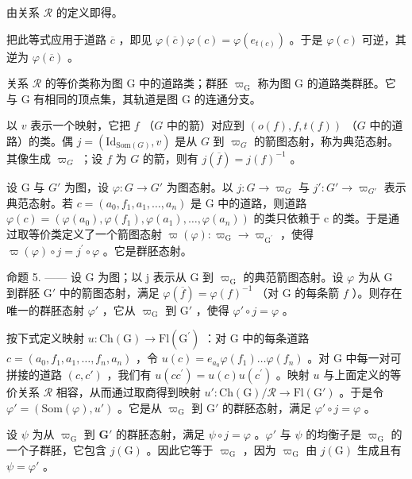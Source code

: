 由关系 \(\mathcal{R}\) 的定义即得。

把此等式应用于道路 \(\overline{c}\) ，即见 \(\varphi(\overline{c})\varphi(c)=\varphi(e_{t(c)})\) 。于是 \(\varphi(c)\) 可逆，其逆为 \(\varphi(\overline{c})\) 。

关系 \(\mathcal{R}\) 的等价类称为图 G 中的道路类；群胚 \(\varpi_{\mathrm{G}}\) 称为图 G 的道路类群胚。它与 G 有相同的顶点集，其轨道是图 G 的连通分支。

以 \(v\) 表示一个映射，它把 \(f\) （\(G\) 中的箭）对应到 \((o(f), f, t(f))\) （\(G\) 中的道路）的类。偶 \(j = (\mathrm{Id}_{\mathrm{Som}(G)}, v)\) 是从 \(G\) 到 \(\varpi_G\) 的箭图态射，称为典范态射。其像生成 \(\varpi_G\) ；设 \(f\) 为 \(G\) 的箭，则有 \(j(\overline{f}) = j(f)^{-1}\) 。

设 G 与 \(G'\) 为图，设 \(\varphi\colon G \to G'\) 为图态射。以 \(j\colon G \to \varpi_{G}\) 与 \(j'\colon G' \to \varpi_{G'}\) 表示典范态射。若 \(c = (a_0, f_1, a_1, \ldots, a_n)\) 是 G 中的道路，则道路 \(\varphi(c) = (\varphi(a_0), \varphi(f_1), \varphi(a_1), \ldots, \varphi(a_n))\) 的类只依赖于 c 的类。于是通过取等价类定义了一个箭图态射 \(\varpi(\varphi)\colon\varpi_{\mathrm{G}}\to\varpi_{\mathrm{G}^{\prime}}\) ，使得 \(\varpi(\varphi)\circ j=j^{\prime}\circ\varphi\) 。它是群胚态射。

命题 5. —— 设 G 为图；以 j 表示从 G 到 \(\varpi_{\mathrm{G}}\) 的典范箭图态射。设 \(\varphi\) 为从 G 到群胚 \(\mathrm{G}'\) 中的箭图态射，满足 \(\varphi(\overline{f}) = \varphi(f)^{-1}\) （对 G 的每条箭 \(f\) ）。则存在唯一的群胚态射 \(\varphi'\) ，它从 \(\varpi_{\mathrm{G}}\) 到 \(\mathrm{G}'\) ，使得 \(\varphi' \circ j = \varphi\) 。

按下式定义映射 \(u\colon \mathrm{Ch}(\mathrm{G})\to \mathrm{Fl}(\mathrm{G}^{\prime})\) ：对 G 中的每条道路 \(c = (a_0,f_1,a_1,\ldots ,f_n,a_n)\) ，令 \(u(c) = e_{a_0}\varphi (f_1)\dots \varphi (f_n)\) 。对 G 中每一对可拼接的道路 \((c,c')\) ，我们有 \(u(cc^{\prime}) = u(c)u(c^{\prime})\) 。映射 \(u\) 与上面定义的等价关系 \(\mathcal{R}\) 相容，从而通过取商得到映射 \(u'\colon \mathrm{Ch}(\mathrm{G}) / \mathcal{R}\to \mathrm{Fl}(\mathrm{G}')\) 。于是令 \(\varphi ' = (\mathrm{Som}(\varphi),u')\) 。它是从 \(\varpi_{\mathrm{G}}\) 到 \(\mathrm{G}'\) 的群胚态射，满足 \(\varphi '\circ j = \varphi\) 。

设 \(\psi\) 为从 \(\varpi_{\mathrm{G}}\) 到 \(\mathbf{G}'\) 的群胚态射，满足 \(\psi \circ j = \varphi\) 。\(\varphi'\) 与 \(\psi\) 的均衡子是 \(\varpi_{\mathrm{G}}\) 的一个子群胚，它包含 \(j(\mathrm{G})\) 。因此它等于 \(\varpi_{\mathrm{G}}\) ，因为 \(\varpi_{\mathrm{G}}\) 由 \(j(\mathrm{G})\) 生成且有 \(\psi = \varphi'\) 。

